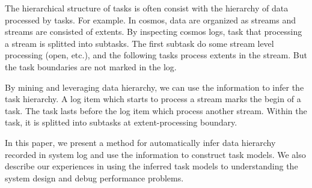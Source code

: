 The hierarchical structure of tasks is often consist with
the hierarchy of data processed by tasks. For example. In
cosmos, data are organized as streams and streams are
consisted of extents. By inspecting cosmos logs, task that
processing a stream is splitted into subtasks. The first
subtask do some stream level processing (open, etc.), and
the following tasks process extents in the stream. But the
task boundaries are not marked in the log.

By mining and leveraging data hierarchy, we can use the
information to infer the task hierarchy. A log item which
starts to process a stream marks the begin of a task. The
task lasts before the log item which process another stream.
Within the task, it is splitted into subtasks at
extent-processing boundary.

In this paper, we present a method for automatically infer
data hierarchy recorded in system log and use the
information to construct task models.  We also describe our
experiences in using the inferred task models to
understanding the system design and debug performance
problems.


